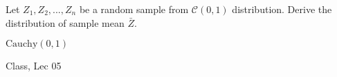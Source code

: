 \begin{samepage}
\begin{ex}
Let $Z_1, Z_2, ..., Z_n$ be a random sample from $\mathcal{C}(0,1)$ distribution. Derive the distribution of sample mean $\bar{Z}$.
\end{ex}
\begin{ans}
$\text{Cauchy}(0,1)$
\end{ans}
\begin{source}
Class, Lec 05
\end{source}
\end{samepage}
